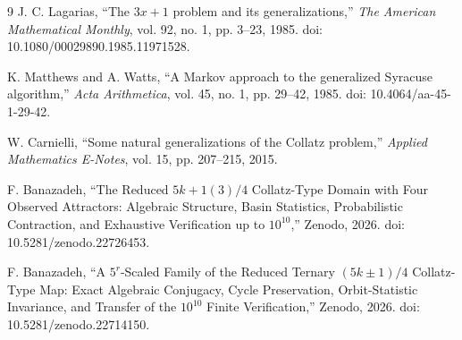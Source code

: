 \documentclass[11pt]{article}
\begin{document}
\begin{thebibliography}{9}
J. C. Lagarias, ``The $3x+1$ problem and its generalizations,'' \emph{The American Mathematical Monthly}, vol. 92, no. 1, pp. 3--23, 1985. doi: 10.1080/00029890.1985.11971528.

K. Matthews and A. Watts, ``A Markov approach to the generalized Syracuse algorithm,'' \emph{Acta Arithmetica}, vol. 45, no. 1, pp. 29--42, 1985. doi: 10.4064/aa-45-1-29-42.

W. Carnielli, ``Some natural generalizations of the Collatz problem,'' \emph{Applied Mathematics E-Notes}, vol. 15, pp. 207--215, 2015.

F. Banazadeh, ``The Reduced $5k+1(3)/4$ Collatz-Type Domain with Four Observed Attractors: Algebraic Structure, Basin Statistics, Probabilistic Contraction, and Exhaustive Verification up to $10^{10}$,'' Zenodo, 2026. doi: 10.5281/zenodo.22726453.

F. Banazadeh, ``A $5^r$-Scaled Family of the Reduced Ternary $(5k\pm1)/4$ Collatz-Type Map: Exact Algebraic Conjugacy, Cycle Preservation, Orbit-Statistic Invariance, and Transfer of the $10^{10}$ Finite Verification,'' Zenodo, 2026. doi: 10.5281/zenodo.22714150.
\end{thebibliography}
\end{document}
